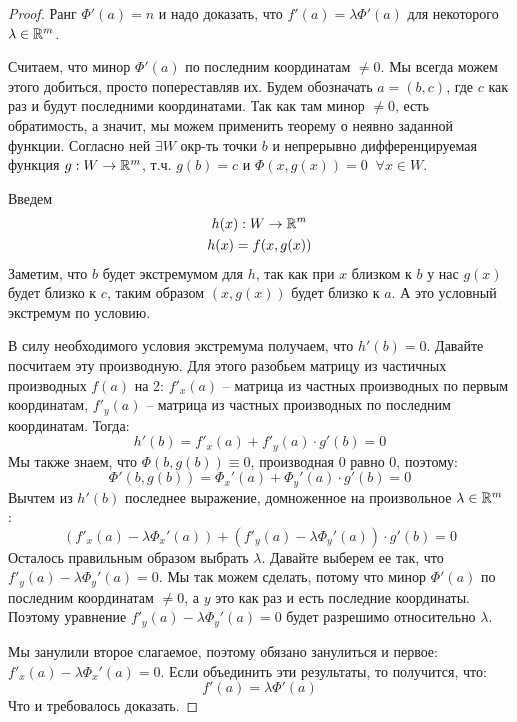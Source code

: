 \begin{proof}
    Ранг $\Phi'(a) = n$ и надо доказать, что $f'(a) = \lambda \Phi'(a)$ для некоторого $\lambda \in \mathbb{R}^m$.

    Считаем, что минор $\Phi'(a)$ по последним координатам $\neq 0$.
    Мы всегда можем этого добиться, просто попереставляв их. 
    Будем обозначать $a = (b, c)$, где $c$ как раз и будут последними координатами.
    Так как там минор $\neq 0$, есть обратимость, а значит, мы можем применить теорему о неявно заданной функции.
    Согласно ней $\exists W$ окр-ть точки $b$ и непрерывно дифференцируемая функция $g: W \to \mathbb{R}^m$, т.ч. $g(b) = c$ и $\Phi(x, g(x)) = 0 \;\; \forall x \in W$.

    Введем \begin{gather*}
        h(x): W \to \mathbb{R}^m \\ h(x) = f(x, g(x))
    \end{gather*} 
    Заметим, что $b$ будет экстремумом для $h$, так как при $x$ близком к $b$ у нас $g(x)$ будет близко к $c$, таким образом $(x, g(x))$ будет близко к $a$. А это условный экстремум по условию.

    В силу необходимого условия экстремума получаем, что $h'(b) = 0$.
    Давайте посчитаем эту производную. 
    Для этого разобьем матрицу из частичных производных $f(a)$ на 2: $f'_x(a)$ -- матрица из частных производных по первым координатам, $f'_y(a)$ -- матрица из частных производных по последним координатам.
    Тогда: \[ h'(b) = f'_x(a) + f'_y(a) \cdot g'(b) = 0 \]
    Мы также знаем, что $\Phi(b, g(b)) \equiv 0$, производная 0 равно 0, поэтому: \[ \Phi'(b, g(b)) = \Phi_x'(a) + \Phi_y'(a)\cdot g'(b) = 0  \]
    Вычтем из $h'(b)$ последнее выражение, домноженное на произвольное $\lambda \in \mathbb{R}^m$ : \[ (f'_x(a) - \lambda \Phi_x'(a)) + (f'_y(a) - \lambda \Phi_y'(a))\cdot g'(b) = 0  \]
    Осталось правильным образом выбрать $\lambda$. 
    Давайте выберем ее так, что $f'_y(a) - \lambda \Phi_y'(a) = 0$. 
    Мы так можем сделать, потому что  минор $\Phi'(a)$ по последним координатам $\neq 0$, а $y$ это как раз и есть последние координаты.
    Поэтому уравнение $f'_y(a) - \lambda \Phi_y'(a) = 0$ будет разрешимо относительно $\lambda$.

    Мы занулили второе слагаемое, поэтому обязано занулиться и первое: $f'_x(a) - \lambda \Phi_x'(a) = 0$.
    Если объединить эти результаты, то получится, что: \[ f'(a) = \lambda \Phi'(a) \]
    Что и требовалось доказать.
\end{proof}

\vspace*{5mm}

